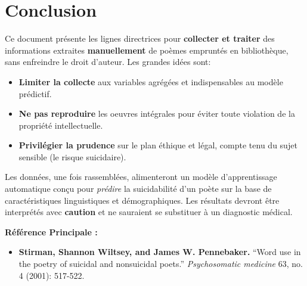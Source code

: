 \documentclass[12pt,a4paper]{article}
\begin{document}
\section{Conclusion}

Ce document présente les lignes directrices pour \textbf{collecter et traiter} 
des informations extraites \textbf{manuellement} de poèmes empruntés en bibliothèque, 
sans enfreindre le droit d'auteur. Les grandes idées sont:
\begin{itemize}
    \item \textbf{Limiter la collecte} aux variables agrégées et indispensables 
    au modèle prédictif.
    \item \textbf{Ne pas reproduire} les oeuvres intégrales pour éviter toute 
    violation de la propriété intellectuelle.
    \item \textbf{Privilégier la prudence} sur le plan éthique et légal, 
    compte tenu du sujet sensible (le risque suicidaire).
\end{itemize}

Les données, une fois rassemblées, alimenteront un modèle d'apprentissage 
automatique conçu pour \textit{prédire} la suicidabilité d'un poète sur 
la base de caractéristiques linguistiques et démographiques. Les résultats 
devront être interprétés avec \textbf{caution} et ne sauraient se substituer 
à un diagnostic médical.

\bigskip
\textbf{Référence Principale :}
\begin{itemize}
    \item \textbf{Stirman, Shannon Wiltsey, and James W. Pennebaker.} 
    ``Word use in the poetry of suicidal and nonsuicidal poets.'' 
    \textit{Psychosomatic medicine} 63, no. 4 (2001): 517-522.
\end{itemize}
\end{document}
